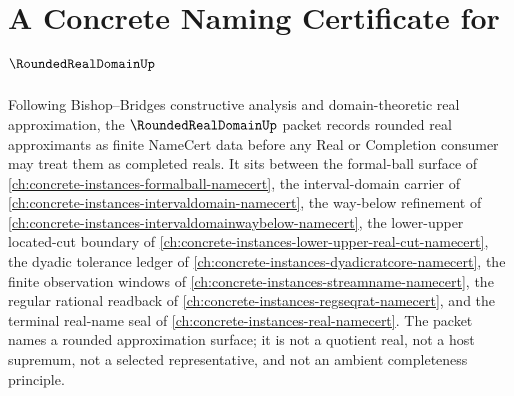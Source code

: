 \chapter{A Concrete Naming Certificate for $\RoundedRealDomainUp$}
\label{ch:concrete-instances-rounded-real-domain-namecert}

Following Bishop--Bridges constructive analysis and domain-theoretic real approximation, the $\RoundedRealDomainUp$ packet records rounded real approximants as finite NameCert data before any Real or Completion consumer may treat them as completed reals. It sits between the formal-ball surface of \autoref{ch:concrete-instances-formalball-namecert}, the interval-domain carrier of \autoref{ch:concrete-instances-intervaldomain-namecert}, the way-below refinement of \autoref{ch:concrete-instances-intervaldomainwaybelow-namecert}, the lower-upper located-cut boundary of \autoref{ch:concrete-instances-lower-upper-real-cut-namecert}, the dyadic tolerance ledger of \autoref{ch:concrete-instances-dyadicratcore-namecert}, the finite observation windows of \autoref{ch:concrete-instances-streamname-namecert}, the regular rational readback of \autoref{ch:concrete-instances-regseqrat-namecert}, and the terminal real-name seal of \autoref{ch:concrete-instances-real-namecert}. The packet names a rounded approximation surface; it is not a quotient real, not a host supremum, not a selected representative, and not an ambient completeness principle.

